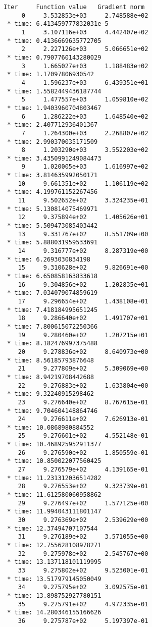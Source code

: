 \documentclass[12pt,a4paper]{article}
\begin{document}
\begin{lstlisting}
Iter     Function value   Gradient norm 
     0     3.532853e+03     2.748588e+02
 * time: 6.413459777832031e-5
     1     3.107116e+03     4.442407e+02
 * time: 0.4136669635772705
     2     2.227126e+03     5.066651e+02
 * time: 0.7907760143280029
     3     1.665027e+03     1.188483e+02
 * time: 1.17097806930542
     4     1.596237e+03     6.439351e+01
 * time: 1.5582449436187744
     5     1.477557e+03     1.059810e+02
 * time: 1.9403960704803467
     6     1.286222e+03     1.648540e+02
 * time: 2.407712936401367
     7     1.264300e+03     2.268807e+02
 * time: 2.990370035171509
     8     1.203290e+03     3.552203e+02
 * time: 3.4350991249084473
     9     1.020005e+03     1.616997e+02
 * time: 3.814635992050171
    10     9.661351e+02     1.106119e+02
 * time: 4.199761152267456
    11     9.502652e+02     3.324235e+01
 * time: 5.130814075469971
    12     9.375894e+02     1.405626e+01
 * time: 5.509473085403442
    13     9.331767e+02     8.551709e+00
 * time: 5.888031959533691
    14     9.316777e+02     8.287319e+00
 * time: 6.2693030834198
    15     9.310628e+02     9.826691e+00
 * time: 6.650858163833618
    16     9.304856e+02     1.202835e+01
 * time: 7.034079074859619
    17     9.296654e+02     1.438108e+01
 * time: 7.418184995651245
    18     9.286640e+02     1.491707e+01
 * time: 7.800615072250366
    19     9.280460e+02     1.207215e+01
 * time: 8.182476997375488
    20     9.278836e+02     8.640973e+00
 * time: 8.56185793876648
    21     9.277809e+02     5.309069e+00
 * time: 8.94219708442688
    22     9.276883e+02     1.633804e+00
 * time: 9.32240915298462
    23     9.276640e+02     8.767615e-01
 * time: 9.704604148864746
    24     9.276611e+02     7.626913e-01
 * time: 10.0868980884552
    25     9.276601e+02     4.552148e-01
 * time: 10.468925952911377
    26     9.276590e+02     1.850559e-01
 * time: 10.850022077560425
    27     9.276579e+02     4.139165e-01
 * time: 11.231312036514282
    28     9.276553e+02     9.323739e-01
 * time: 11.612580060958862
    29     9.276497e+02     1.577125e+00
 * time: 11.994043111801147
    30     9.276369e+02     2.539629e+00
 * time: 12.37494707107544
    31     9.276189e+02     3.571055e+00
 * time: 12.755628108978271
    32     9.275978e+02     2.545767e+00
 * time: 13.137118101119995
    33     9.275802e+02     9.523001e-01
 * time: 13.517979145050049
    34     9.275795e+02     3.092575e-01
 * time: 13.898752927780151
    35     9.275791e+02     4.972335e-01
 * time: 14.280346155166626
    36     9.275787e+02     5.197397e-01

\end{lstlisting}
\end{document}
